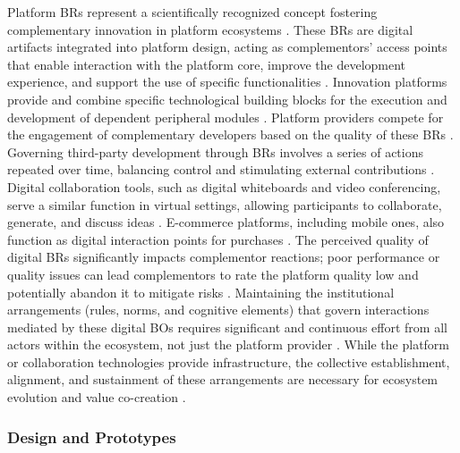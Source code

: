 \documentclass[12pt,oneside]{article}
\begin{document}
Platform \ac{BR}s represent a scientifically recognized concept fostering complementary innovation in platform ecosystems \citep[2]{petrik2021exploring}. These \ac{BR}s are digital artifacts integrated into platform design, acting as complementors’ access points that enable interaction with the platform core, improve the development experience, and support the use of specific functionalities \citep[5]{petrik2021exploring}. Innovation platforms provide and combine specific technological building blocks for the execution and development of dependent peripheral modules \citep[2]{petrik2021exploring}. Platform providers compete for the engagement of complementary developers based on the quality of these \ac{BR}s \citep[4]{petrik2021exploring}. Governing third-party development through \ac{BR}s involves a series of actions repeated over time, balancing control and stimulating external contributions \citep[14]{ghazawneh2010governing}. Digital collaboration tools, such as digital whiteboards and video conferencing, serve a similar function in virtual settings, allowing participants to collaborate, generate, and discuss ideas \citep[5]{bakhaev2023cocreating}. E-commerce platforms, including mobile ones, also function as digital interaction points for purchases \citep[221]{corsaro2018crossing}. \newline
The perceived quality of digital \ac{BR}s significantly impacts complementor reactions; poor performance or quality issues can lead complementors to rate the platform quality low and potentially abandon it to mitigate risks \citep[4]{petrik2021exploring}. Maintaining the institutional arrangements (rules, norms, and cognitive elements) that govern interactions mediated by these digital \ac{BO}s requires significant and continuous effort from all actors within the ecosystem, not just the platform provider \citep[312, 314-315]{elo2024enabling}. While the platform or collaboration technologies provide infrastructure, the collective establishment, alignment, and sustainment of these arrangements are necessary for ecosystem evolution and value co-creation \citep[315]{elo2024enabling}.

\subsubsection{Design and Prototypes} \label{design-prototypes}
\end{document}
